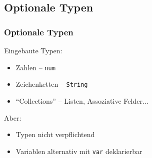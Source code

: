 \documentclass{beamer}
\begin{document}
\subsection{Optionale Typen}
\begin{frame}[fragile]
\frametitle{Optionale Typen}

Eingebaute Typen:
\begin{itemize}
\item Zahlen -- \lstinline|num|
\item Zeichenketten -- \lstinline|String|
\item ``Collections'' -- Listen, Assoziative Felder...
\end{itemize}
\pause
Aber:
\begin{itemize}
\item Typen nicht verpflichtend
\item Variablen alternativ mit \lstinline|var| deklarierbar
\end{itemize}
\end{frame}
\end{document}
